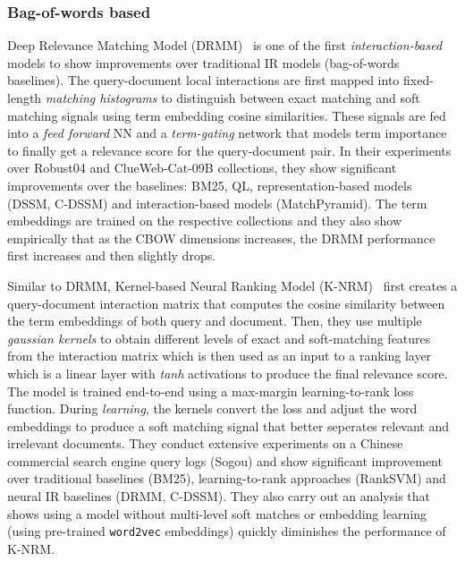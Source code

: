 \subsubsection{Bag-of-words based} 
\textsf{Deep Relevance Matching Model} (DRMM)~\citep{Guo2016} is one of the first \textit{interaction-based} models to show improvements over traditional IR models (bag-of-words baselines). The query-document local interactions are first mapped into fixed-length \textit{matching histograms} to distinguish between exact matching and soft matching signals using term embedding cosine similarities. These signals are fed into a \textit{feed forward} NN and a \textit{term-gating} network that models term importance to finally get a relevance score for the query-document pair. In their experiments over Robust04 and ClueWeb-Cat-09B collections, they show significant improvements over the baselines: BM25, QL, representation-based models (DSSM, C-DSSM) and interaction-based models (MatchPyramid). The term embeddings are trained on the respective collections and they also show empirically that as the CBOW dimensions increases, the DRMM performance first increases and then slightly drops.

Similar to DRMM, \textsf{Kernel-based Neural Ranking Model} (K-NRM)~\citep{KNRM17} first creates a query-document interaction matrix that computes the cosine similarity between the term embeddings of both query and document. Then, they use multiple \textit{gaussian kernels} to obtain different levels of exact and soft-matching features from the interaction matrix which is then used as an input to a ranking layer which is a linear layer with \textit{tanh} activations to produce the final relevance score. The model is trained end-to-end using a max-margin learning-to-rank loss function. During \textit{learning}, the kernels convert the loss and adjust the word embeddings to produce a soft matching signal that better seperates relevant and irrelevant documents. They conduct extensive experiments on a Chinese commercial search engine query logs (Sogou) and show significant improvement over traditional baselines (BM25), learning-to-rank approaches (RankSVM) and neural IR baselines (DRMM, C-DSSM). They also carry out an analysis that shows using a model without multi-level soft matches or embedding learning (using pre-trained \texttt{word2vec} embeddings) quickly diminishes the performance of K-NRM.


